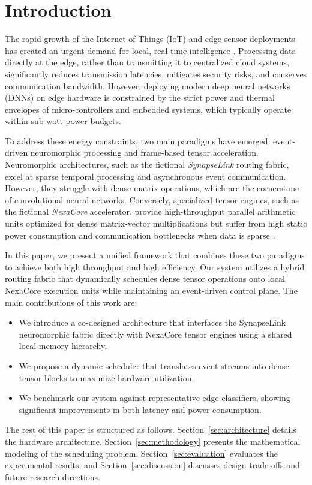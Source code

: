 \section{Introduction}
\label{sec:introduction}

The rapid growth of the Internet of Things (IoT) and edge sensor deployments has created an urgent demand for local, real-time intelligence \cite{Reynolds2025}. Processing data directly at the edge, rather than transmitting it to centralized cloud systems, significantly reduces transmission latencies, mitigates security risks, and conserves communication bandwidth. However, deploying modern deep neural networks (DNNs) on edge hardware is constrained by the strict power and thermal envelopes of micro-controllers and embedded systems, which typically operate within sub-watt power budgets.

To address these energy constraints, two main paradigms have emerged: event-driven neuromorphic processing and frame-based tensor acceleration. Neuromorphic architectures, such as the fictional \textit{SynapseLink} routing fabric, excel at sparse temporal processing and asynchronous event communication. However, they struggle with dense matrix operations, which are the cornerstone of convolutional neural networks. Conversely, specialized tensor engines, such as the fictional \textit{NexaCore} accelerator, provide high-throughput parallel arithmetic units optimized for dense matrix-vector multiplications but suffer from high static power consumption and communication bottlenecks when data is sparse \cite{Rostova2024}.

In this paper, we present a unified framework that combines these two paradigms to achieve both high throughput and high efficiency. Our system utilizes a hybrid routing fabric that dynamically schedules dense tensor operations onto local NexaCore execution units while maintaining an event-driven control plane. The main contributions of this work are:
\begin{itemize}
    \item We introduce a co-designed architecture that interfaces the SynapseLink neuromorphic fabric directly with NexaCore tensor engines using a shared local memory hierarchy.
    \item We propose a dynamic scheduler that translates event streams into dense tensor blocks to maximize hardware utilization.
    \item We benchmark our system against representative edge classifiers, showing significant improvements in both latency and power consumption.
\end{itemize}

The rest of this paper is structured as follows. Section~\ref{sec:architecture} details the hardware architecture. Section~\ref{sec:methodology} presents the mathematical modeling of the scheduling problem. Section~\ref{sec:evaluation} evaluates the experimental results, and Section~\ref{sec:discussion} discusses design trade-offs and future research directions.
